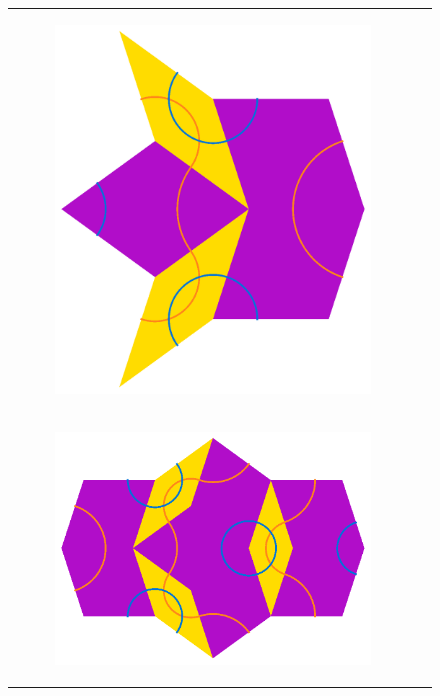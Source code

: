 \documentclass[
  oneside,
  11pt, a4paper,
  footinclude=true,
  headinclude=true,
  cleardoublepage=empty
]{scrbook}
\begin{document}
\begin{figure}[H]
\begin{tabular}{cc}
\begin{subfigure}[b]{0.4\textwidth}
             \includegraphics[scale=0.4]{FatInflation1}
             \end{subfigure}   \\
	       	 \begin{subfigure}[b]{0.4\textwidth}
             \centering
             \includegraphics[scale=0.4]{FatInflation2}

\end{subfigure}
\end{tabular}
\end{figure}
\end{document}
